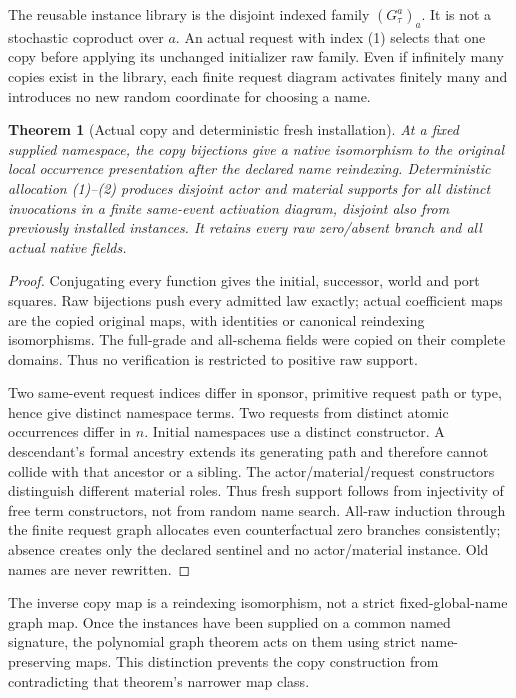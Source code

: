 \documentclass[11pt]{article}
\newtheorem{theorem}{Theorem}\newtheorem{proposition}{Proposition}
\begin{document}
The reusable instance library is the disjoint indexed family $(G_\tau^a)_a$. It is not a stochastic coproduct over $a$. An actual request with index (1) selects that one copy before applying its unchanged initializer raw family. Even if infinitely many copies exist in the library, each finite request diagram activates finitely many and introduces no new random coordinate for choosing a name.

\begin{theorem}[Actual copy and deterministic fresh installation]
At a fixed supplied namespace, the copy bijections give a native isomorphism to the original local occurrence presentation after the declared name reindexing. Deterministic allocation (1)--(2) produces disjoint actor and material supports for all distinct invocations in a finite same-event activation diagram, disjoint also from previously installed instances. It retains every raw zero/absent branch and all actual native fields.
\end{theorem}
\begin{proof}
Conjugating every function gives the initial, successor, world and port squares. Raw bijections push every admitted law exactly; actual coefficient maps are the copied original maps, with identities or canonical reindexing isomorphisms. The full-grade and all-schema fields were copied on their complete domains. Thus no verification is restricted to positive raw support.

Two same-event request indices differ in sponsor, primitive request path or type, hence give distinct namespace terms. Two requests from distinct atomic occurrences differ in $n$. Initial namespaces use a distinct constructor. A descendant's formal ancestry extends its generating path and therefore cannot collide with that ancestor or a sibling. The actor/material/request constructors distinguish different material roles. Thus fresh support follows from injectivity of free term constructors, not from random name search. All-raw induction through the finite request graph allocates even counterfactual zero branches consistently; absence creates only the declared sentinel and no actor/material instance. Old names are never rewritten.\end{proof}

The inverse copy map is a reindexing isomorphism, not a strict fixed-global-name graph map. Once the instances have been supplied on a common named signature, the polynomial graph theorem acts on them using strict name-preserving maps. This distinction prevents the copy construction from contradicting that theorem's narrower map class.
\end{document}
